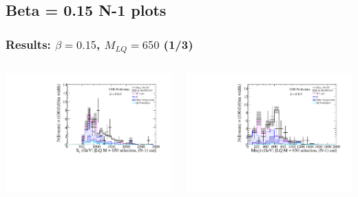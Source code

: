 \documentclass[bigger]{beamer}
\begin{document}
\subsection{Beta = 0.15 N-1 plots}
\label{sec-5-4}
\begin{frame}
\frametitle{Results: $\beta = 0.15$, $M_{LQ} = 650$ (1/3)}
\label{sec-5-4-1}
\begin{columns}
\begin{column}{0.6\textwidth}
\label{sec-5-4-1-1}

\centering
\ST
\includegraphics[width=\textwidth]{fig/enu/nMinus1/ST_mtAndMetAndMejLQ650_enujj.pdf}
\end{column}
\begin{column}{0.6\textwidth}
\label{sec-5-4-1-2}

\centering
\mej
\includegraphics[width=\textwidth]{fig/enu/nMinus1/Mej_stAndMtAndMetLQ650_enujj.pdf}
\end{column}
\end{columns}
\end{frame}
\end{document}
